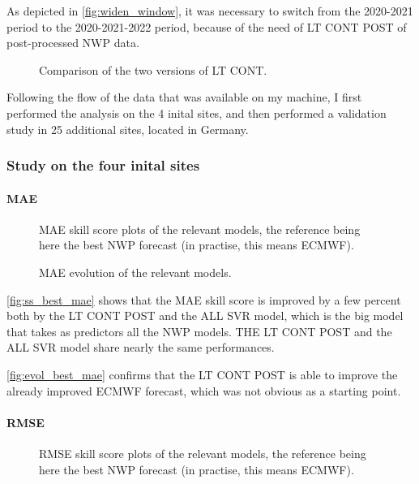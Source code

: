 As depicted in \autoref{fig:widen_window}, it was necessary to switch from the 2020-2021 period to the 2020-2021-2022 period, because of the need of LT CONT POST of post-processed NWP data.
\begin{figure}[htb!]
    \centering
    
\caption{Comparison of the two versions of LT CONT.}
\label{fig:widen_window}
\end{figure}

Following the flow of the data that was available on my machine, I first performed the analysis on the 4 inital sites, and then performed a validation study in 25 additional sites, located in Germany.

\subsubsection{Study on the four inital sites}
\label{sec:initial_study}
\paragraph{MAE}
\begin{figure}[htb!]
    \centering
    
\caption{MAE skill score plots of the relevant models, the reference being here the best NWP forecast (in practise, this means ECMWF).}
\label{fig:ss_best_mae}
\end{figure}

\begin{figure}[htb!]
    \centering
    
\caption{MAE evolution of the relevant models.}
\label{fig:evol_best_mae}
\end{figure}
\autoref{fig:ss_best_mae} shows that the MAE skill score is improved by a few percent both by the LT CONT POST and the ALL SVR model, which is the big model that takes as predictors all the NWP models. THE LT CONT POST and the ALL SVR model share nearly the same performances.

\autoref{fig:evol_best_mae} confirms that the LT CONT POST is able to improve the already improved ECMWF forecast, which was not obvious as a starting point.

\paragraph{RMSE}
\begin{figure}[htb!]
    \centering
    
\caption{RMSE skill score plots of the relevant models, the reference being here the best NWP forecast (in practise, this means ECMWF).}
\label{fig:ss_best_rmse}
\end{figure}

